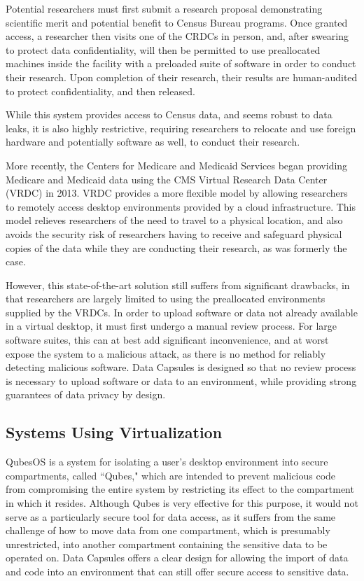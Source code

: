 \documentclass{acm_proc_article-sp}
\begin{document}
Potential researchers must first submit a research proposal demonstrating
scientific merit and potential benefit to Census Bureau programs.  Once granted
access, a researcher then visits one of the CRDCs in person, and, after swearing
to protect data confidentiality, will then be permitted to use preallocated
machines inside the facility with a preloaded suite of software in order to
conduct their research.  Upon completion of their research, their results are
human-audited to protect confidentiality, and then released.

While this system provides access to Census data, and seems robust to data
leaks, it is also highly restrictive, requiring researchers to relocate and use
foreign hardware and potentially software as well, to conduct their research.

More recently, the Centers for Medicare and Medicaid Services began providing
Medicare and Medicaid data using the CMS Virtual Research Data Center (VRDC) in
2013.  VRDC provides a more flexible model by allowing researchers to remotely
access desktop environments provided by a cloud infrastructure.  This model
relieves researchers of the need to travel to a physical location, and also
avoids the security risk of researchers having to receive and safeguard physical
copies of the data while they are conducting their research, as was formerly the
case.

However, this state-of-the-art solution still suffers from significant
drawbacks, in that researchers are largely limited to using the preallocated
environments supplied by the VRDCs.  In order to upload software or data not
already available in a virtual desktop, it must first undergo a manual review
process.  For large software suites, this can at best add significant
inconvenience, and at worst expose the system to a malicious attack, as there is
no method for reliably detecting malicious software.  Data Capsules is designed
so that no review process is necessary to upload software or data to an
environment, while providing strong guarantees of data privacy by design.

\subsection{Systems Using Virtualization}

QubesOS \cite{qubes} is a system for isolating a user's desktop environment into
secure compartments, called ``Qubes," which are intended to prevent malicious
code from compromising the entire system by restricting its effect to the
compartment in which it resides.  Although Qubes is very effective for this 
purpose, it would not serve as a particularly secure tool for data access, as it
suffers from the same challenge of how to move data from one compartment, which
is presumably unrestricted, into another compartment containing the sensitive
data to be operated on.  Data Capsules offers a clear design for allowing the
import of data and code into an environment that can still offer secure access
to sensitive data.
\end{document}
